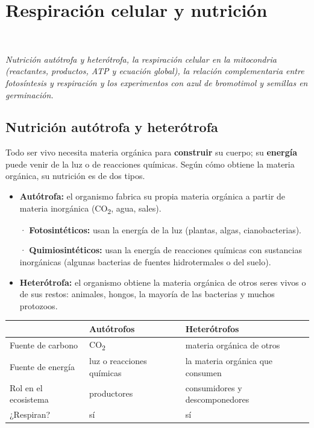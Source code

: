 \section[Respiración celular y nutrición]{Respiración celular y nutrición}
\modcomun\ \ {\color{gris}\itshape Nutrición autótrofa y heterótrofa, la respiración celular en la mitocondria (reactantes, productos, ATP y ecuación global), la relación complementaria entre fotosíntesis y respiración y los experimentos con azul de bromotimol y semillas en germinación.\par}
\subsection{Nutrición autótrofa y heterótrofa}
Todo ser vivo necesita materia orgánica para \textbf{construir} su cuerpo; su \textbf{energía} puede venir de la luz o de reacciones químicas. Según cómo obtiene la materia orgánica, su nutrición es de dos tipos.

 
\begin{itemize}
  \item \textbf{Autótrofa:} el organismo fabrica su propia materia orgánica a partir de materia inorgánica (CO\textsubscript{2}, agua, sales).\par · \textbf{Fotosintéticos:} usan la energía de la luz (plantas, algas, cianobacterias).\par · \textbf{Quimiosintéticos:} usan la energía de reacciones químicas con sustancias inorgánicas (algunas bacterias de fuentes hidrotermales o del suelo).
  \item \textbf{Heterótrofa:} el organismo obtiene la materia orgánica de otros seres vivos o de sus restos: animales, hongos, la mayoría de las bacterias y muchos protozoos.
\end{itemize}
  
\begin{center}\small
\begin{tabularx}{\linewidth}{@{}>{\raggedright\arraybackslash\hsize=0.78\hsize}X>{\raggedright\arraybackslash\hsize=0.97\hsize}X>{\raggedright\arraybackslash\hsize=1.25\hsize}X@{}}
\toprule
 & \textbf{Autótrofos} & \textbf{Heterótrofos} \\
\midrule
Fuente de carbono & CO\textsubscript{2} & materia orgánica de otros \\
Fuente de energía & luz o reacciones químicas & la materia orgánica que consumen \\
Rol en el ecosistema & productores & consumidores y descomponedores \\
¿Respiran? & sí & sí \\
\bottomrule
\end{tabularx}
\end{center}
 
